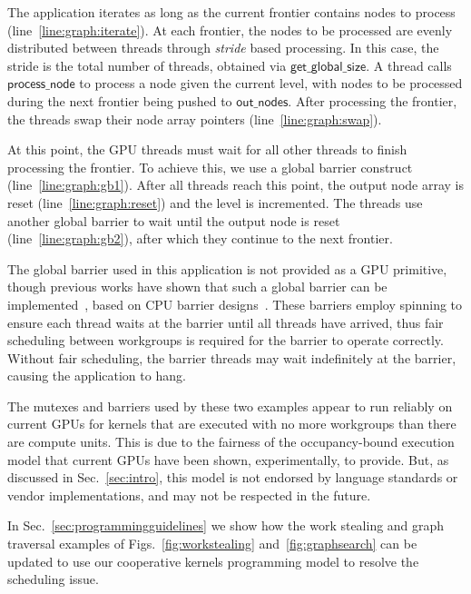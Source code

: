 \documentclass[sigconf]{acmart}
\newcommand{\TSAdded}[1]{#1}
\newcommand{\myfigs}{Figs.~}
\newcommand{\mysec}{Sec.~}
\newcommand{\code}[1]{\lstset{basicstyle=\tt}\lstinline!#1!\lstset{basicstyle=\scriptsize\tt}}
\newcommand{\getglobalsize}{\mathsf{get\_global\_size}}
\newcommand{\keyword}[1]{\mathsf{#1}}
\begin{document}
The application iterates as long as the current frontier contains
nodes to process (line~\ref{line:graph:iterate}). At each frontier,
the nodes to be processed are evenly distributed between
threads through \emph{stride} based processing.
%
In this case, the stride is the total number of threads, obtained via
$\getglobalsize$.
A thread calls $\keyword{process\_node}$ to process a node given the current level, with nodes to be processed during the next frontier being pushed to $\keyword{out\_nodes}$. After processing the frontier, the threads swap their
node array pointers (line~\ref{line:graph:swap}).

At this point, the GPU threads must wait for all other threads to
finish processing the frontier. To achieve
this, we use a global barrier construct
(line~\ref{line:graph:gb1}). After all threads reach this point, the
output node array is reset (line~\ref{line:graph:reset}) and the level
is incremented. The threads use another global barrier to wait until the output node is
reset (line~\ref{line:graph:gb2}), after which they continue to the next frontier.

The global barrier used in this application is not provided as a GPU
primitive, though previous works have shown that such a global barrier
can be implemented~\cite{XF10,DBLP:conf/oopsla/SorensenDBGR16}, based
on CPU barrier designs~\cite[ch. 17]{HS08}.  These barriers employ
spinning to ensure each thread waits at the barrier until all threads have
arrived, thus fair scheduling between workgroups is required for the
barrier to operate correctly. \TSAdded{Without fair scheduling, the
  barrier threads may wait indefinitely at the barrier, causing the
  application to hang.}


The mutexes and barriers used by these two examples appear to run
reliably on current GPUs for kernels that are executed with no more
workgroups than there are compute units.  This is due to the fairness
of the occupancy-bound execution model that current GPUs have been
shown, experimentally, to provide.  But, as discussed in
\mysec\ref{sec:intro}, this model is not endorsed by language
standards or vendor implementations, and may not be respected
in the future.
%

In \mysec\ref{sec:programmingguidelines} we show how the work stealing
and graph traversal examples of \myfigs\ref{fig:workstealing} and~\ref{fig:graphsearch} can be
updated to use our cooperative kernels programming model to resolve
the scheduling issue.
\end{document}
